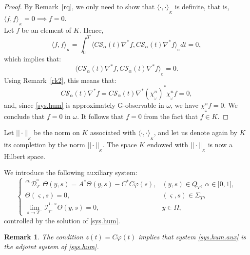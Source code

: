 \documentclass{article}
\newtheorem{remark}[theorem]{Remark}
\begin{document}
\begin{proof}
By Remark~\ref{rq}, we only need to show that 
$\langle \cdot,\cdot\rangle_{_K}$ is definite, 
that is, $\langle f,f\rangle_{_K} = 0 \implies f=0$.\\
Let $f$ be an element of $K$. Hence, 
$$
\langle f,f\rangle_{_K} = \displaystyle \int_{0}^{T}\langle
C\mathcal{S}_\alpha(t)\nabla^*f,C\mathcal{S}_\alpha(t)
\nabla^*f\rangle_{_\mathbb{O}}dt = 0,
$$
which implies that:
$$ 
\langle C\mathcal{S}_\alpha(t)\nabla^*f,
C\mathcal{S}_\alpha(t)\nabla^*f\rangle_{_\mathbb{O}}  = 0.
$$
Using Remark~\ref{rk2}, this means that:
$$
C\mathcal{S}_\alpha(t)\nabla^*f 
= C\mathcal{S}_\alpha(t)\nabla^*(\chi_{_\omega}^{n})^*
\chi_{_\omega}^{n}f= 0,
$$
and, since \eqref{sys.hum} is approximately G-observable 
in $\omega$, we have $\chi_{_\omega}^{n}f = 0$.
We conclude that $f = 0 $ in $ \omega$. It follows that
$f =  0$ from the fact that $f \in K$.
\end{proof}

Let $||\cdot||_{_K}$ be the norm on $K$ associated with 
$\langle \cdot,\cdot \rangle_{_K}$, 
and let us denote again by $K$ its completion by the norm $||\cdot||_{_K}$. 
The space $K$ endowed with $||\cdot||_{_K}$ is now a Hilbert space.

We introduce the following auxiliary system:
\begin{equation}
\label{sys.hum.aux}
\left\{\begin{array}{llll}
^{^{RL}}\mathcal{D}_{T^-}^{^\alpha}\Theta(y,s) 
=  A^*\Theta(y,s) - C^*C\varphi(s),  & (y,s)\in Q_T, \ \alpha\in]0,1], \\ 
\Theta(\varsigma,s) = 0,  & (\varsigma,s)\in \Sigma_T, \\
\lim\limits_{s\rightarrow T^-}\mathcal{I}_{_{T^-}}^{^{1-\alpha}}\Theta(y,s) = 0, 
& y\in\Omega,
\end{array}\right.
\end{equation} 
controlled by the solution of \eqref{sys.hum}. 

\begin{remark}
The condition $z(t) = C\varphi(t)$ implies that system \eqref{sys.hum.aux} 
is the adjoint system of \eqref{sys.hum}.
\end{remark}
\end{document}
